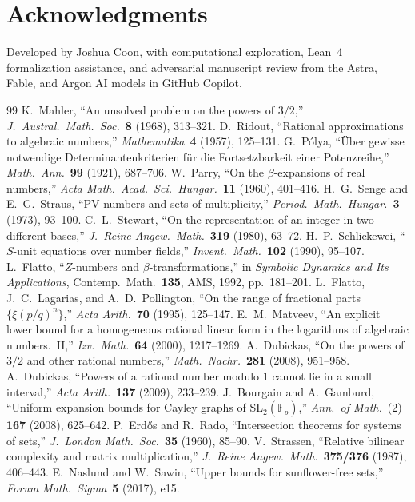 \documentclass[11pt]{article}
\begin{document}
\section*{Acknowledgments}
Developed by Joshua Coon, with computational exploration, Lean~4 formalization assistance, and adversarial manuscript review from the Astra, Fable, and Argon AI models in GitHub Copilot.

\begin{thebibliography}{99}
 K.~Mahler, ``An unsolved problem on the powers of $3/2$,'' \emph{J.\ Austral.\ Math.\ Soc.}\ \textbf{8} (1968), 313--321.
 D.~Ridout, ``Rational approximations to algebraic numbers,'' \emph{Mathematika}\ \textbf{4} (1957), 125--131.
 G.~P\'olya, ``\"Uber gewisse notwendige Determinantenkriterien f\"ur die Fortsetzbarkeit einer Potenzreihe,'' \emph{Math.\ Ann.}\ \textbf{99} (1921), 687--706.
 W.~Parry, ``On the $\beta$-expansions of real numbers,'' \emph{Acta Math.\ Acad.\ Sci.\ Hungar.}\ \textbf{11} (1960), 401--416.
 H.~G.~Senge and E.~G.~Straus, ``PV-numbers and sets of multiplicity,'' \emph{Period.\ Math.\ Hungar.}\ \textbf{3} (1973), 93--100.
 C.~L.~Stewart, ``On the representation of an integer in two different bases,'' \emph{J.\ Reine Angew.\ Math.}\ \textbf{319} (1980), 63--72.
 H.~P.~Schlickewei, ``$S$-unit equations over number fields,'' \emph{Invent.\ Math.}\ \textbf{102} (1990), 95--107.
 L.~Flatto, ``$Z$-numbers and $\beta$-transformations,'' in \emph{Symbolic Dynamics and Its Applications}, Contemp.\ Math.\ \textbf{135}, AMS, 1992, pp.~181--201.
 L.~Flatto, J.~C.~Lagarias, and A.~D.~Pollington, ``On the range of fractional parts $\{\xi(p/q)^n\}$,'' \emph{Acta Arith.}\ \textbf{70} (1995), 125--147.
 E.~M.~Matveev, ``An explicit lower bound for a homogeneous rational linear form in the logarithms of algebraic numbers.\ II,'' \emph{Izv.\ Math.}\ \textbf{64} (2000), 1217--1269.
 A.~Dubickas, ``On the powers of $3/2$ and other rational numbers,'' \emph{Math.\ Nachr.}\ \textbf{281} (2008), 951--958.
 A.~Dubickas, ``Powers of a rational number modulo $1$ cannot lie in a small interval,'' \emph{Acta Arith.}\ \textbf{137} (2009), 233--239.
 J.~Bourgain and A.~Gamburd, ``Uniform expansion bounds for Cayley graphs of $\mathrm{SL}_2(\mathbb{F}_p)$,'' \emph{Ann.\ of Math.}\ (2) \textbf{167} (2008), 625--642.
 P.~Erd\H{o}s and R.~Rado, ``Intersection theorems for systems of sets,'' \emph{J.\ London Math.\ Soc.}\ \textbf{35} (1960), 85--90.
 V.~Strassen, ``Relative bilinear complexity and matrix multiplication,'' \emph{J.\ Reine Angew.\ Math.}\ \textbf{375/376} (1987), 406--443.
 E.~Naslund and W.~Sawin, ``Upper bounds for sunflower-free sets,'' \emph{Forum Math.\ Sigma}\ \textbf{5} (2017), e15.
\end{thebibliography}
\end{document}
